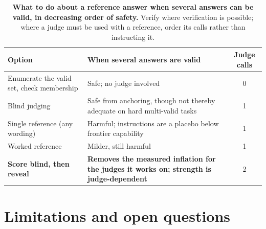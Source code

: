 \documentclass[11pt]{article}
\begin{document}
\begin{table}[tbp]
\centering
\small
\setlength{\tabcolsep}{6pt}
\begin{tabular}{p{4.6cm}p{6.2cm}c}
\toprule
Option & When several answers are valid & Judge calls \\
\midrule
Enumerate the valid set, check membership & Safe; no judge involved & 0 \\
Blind judging & Safe from anchoring, though not thereby adequate on hard multi-valid tasks~\cite{calver2026} & 1 \\
Single reference (any wording) & Harmful; instructions are a placebo below frontier capability & 1 \\
Worked reference & Milder, still harmful & 1 \\
\textbf{Score blind, then reveal} & \textbf{Removes the measured inflation for the judges it works on; strength is judge-dependent} & 2 \\
\bottomrule
\end{tabular}
\caption{\textbf{What to do about a reference answer when several answers can be valid, in decreasing order of safety.} Verify where verification is possible; where a judge must be used with a reference, order its calls rather than instructing it.}
\label{tab:decide}
\end{table}

\section{Limitations and open questions}
\label{sec:limits}
\end{document}
